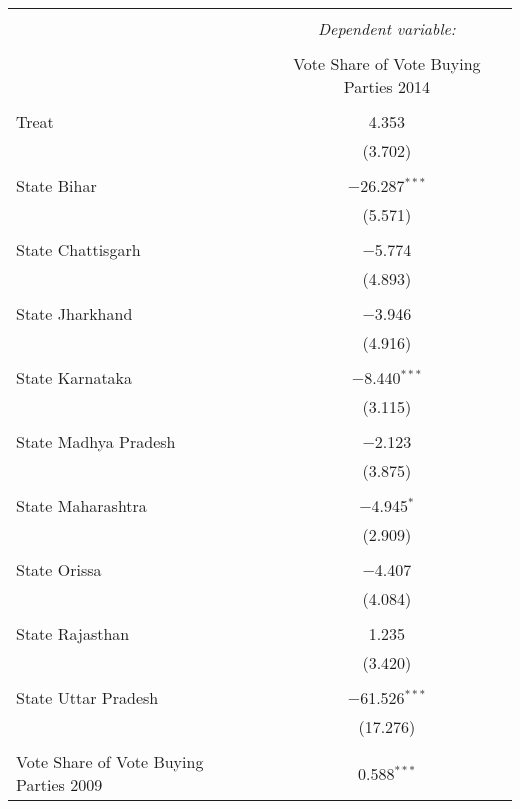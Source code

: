 
\begin{table}[!htbp] \centering 
  \caption{} 
  \label{} 
\begin{tabular}{@{\extracolsep{5pt}}lc} 
\\[-1.8ex]\hline 
\hline \\[-1.8ex] 
 & \multicolumn{1}{c}{\textit{Dependent variable:}} \\ 
\cline{2-2} 
\\[-1.8ex] & Vote Share of Vote Buying Parties 2014 \\ 
\hline \\[-1.8ex] 
 Treat & 4.353 \\ 
  & (3.702) \\ 
  & \\ 
 State Bihar & $-$26.287$^{***}$ \\ 
  & (5.571) \\ 
  & \\ 
 State Chattisgarh & $-$5.774 \\ 
  & (4.893) \\ 
  & \\ 
 State Jharkhand & $-$3.946 \\ 
  & (4.916) \\ 
  & \\ 
 State Karnataka & $-$8.440$^{***}$ \\ 
  & (3.115) \\ 
  & \\ 
 State Madhya Pradesh & $-$2.123 \\ 
  & (3.875) \\ 
  & \\ 
 State Maharashtra & $-$4.945$^{*}$ \\ 
  & (2.909) \\ 
  & \\ 
 State Orissa & $-$4.407 \\ 
  & (4.084) \\ 
  & \\ 
 State Rajasthan & 1.235 \\ 
  & (3.420) \\ 
  & \\ 
 State Uttar Pradesh & $-$61.526$^{***}$ \\ 
  & (17.276) \\ 
  & \\ 
 Vote Share of Vote Buying Parties 2009 & 0.588$^{***}$ \\ 

\end{tabular}
\end{table}
